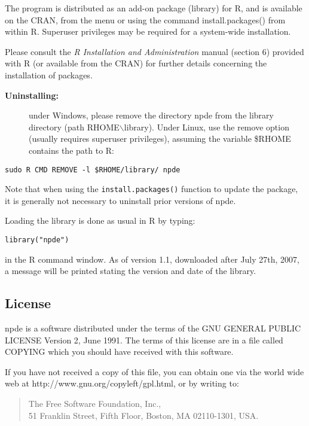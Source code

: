\documentclass[12pt,a4paper]{article}
\begin{document}
The program is distributed as an add-on package (library) for R, and is available on the CRAN, from the menu or using the command {\sf install.packages()} from within {\sf R}. Superuser privileges may be required for a system-wide installation.

Please consult the {\it R Installation and Administration} manual (section 6) provided with {\sf R} (or available from the CRAN) for further details concerning the installation of packages.

\begin{description}
\item[{\bf Uninstalling:}] under Windows, please remove the directory {\sf npde} from the library directory (path RHOME$\backslash$library). Under Linux, use the remove option (usually requires superuser privileges), assuming the variable \$RHOME contains the path to R:
\end{description}
\begin{verbatim}
sudo R CMD REMOVE -l $RHOME/library/ npde 
\end{verbatim}
Note that when using the \texttt{install.packages()} function to update the package, it is generally not necessary to uninstall prior versions of {\sf npde}.

Loading the library is done as usual in R by typing:
\begin{verbatim}
library("npde")
\end{verbatim}
in the {\sf R} command window. As of version 1.1, downloaded after July 27th, 2007, a message will be printed stating the version and date of the library.

\subsection{License}

\hskip 18pt {\sf npde} is a software distributed under the terms of the GNU GENERAL PUBLIC LICENSE Version 2, June 1991.  The terms of this license are in a file called COPYING which you should have received with this software.

If you have not received a copy of this file, you can obtain one via the world wide web at http://www.gnu.org/copyleft/gpl.html, or by writing to:
\begin{quotation}
\noindent The Free Software Foundation, Inc.,\\
51 Franklin Street, Fifth Floor, Boston, MA 02110-1301, USA.
\end{quotation}
\end{document}
